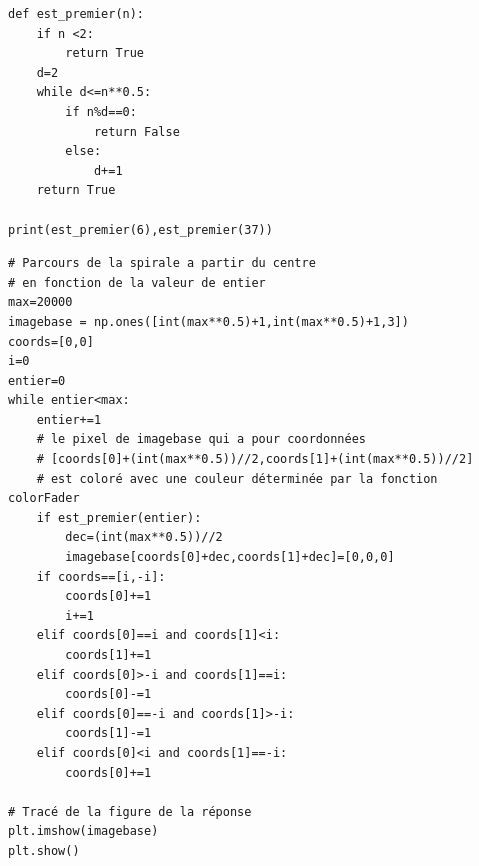 \newpage

\reponse{}

\begin{verbatim}
def est_premier(n):
    if n <2:
        return True
    d=2
    while d<=n**0.5:
        if n%d==0:
            return False
        else:
            d+=1
    return True

print(est_premier(6),est_premier(37))
\end{verbatim}


\reponse{}

\begin{verbatim}
# Parcours de la spirale a partir du centre
# en fonction de la valeur de entier
max=20000
imagebase = np.ones([int(max**0.5)+1,int(max**0.5)+1,3])
coords=[0,0]
i=0
entier=0
while entier<max:
    entier+=1
    # le pixel de imagebase qui a pour coordonnées
    # [coords[0]+(int(max**0.5))//2,coords[1]+(int(max**0.5))//2]
    # est coloré avec une couleur déterminée par la fonction colorFader
    if est_premier(entier):
        dec=(int(max**0.5))//2
        imagebase[coords[0]+dec,coords[1]+dec]=[0,0,0]
    if coords==[i,-i]:
        coords[0]+=1
        i+=1
    elif coords[0]==i and coords[1]<i:
        coords[1]+=1
    elif coords[0]>-i and coords[1]==i:
        coords[0]-=1
    elif coords[0]==-i and coords[1]>-i:
        coords[1]-=1
    elif coords[0]<i and coords[1]==-i:
        coords[0]+=1

# Tracé de la figure de la réponse
plt.imshow(imagebase)
plt.show()
\end{verbatim}


